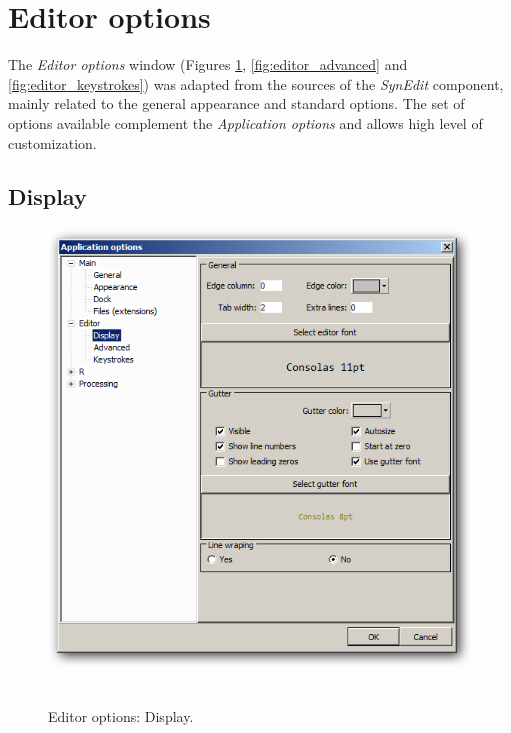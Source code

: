 
\hypertarget{working_editor}{}
\section{Editor options}

The \textit{Editor options} window
(Figures \ref{fig:editor_display}, \ref{fig:editor_advanced} and \ref{fig:editor_keystrokes})
was adapted from the sources of the
\textit{SynEdit} component, mainly related to the general appearance and
standard options. The set of options available complement the
\textit{Application options} and allows high level of customization.


\hypertarget{working_editor_display}{}
\subsection{Display}

\begin{figure}[h!]
  \includegraphics[scale=0.50]{./res/app_editor_display.png}~~
  \caption{Editor options: Display.}
  \label{fig:editor_display}
\end{figure}

